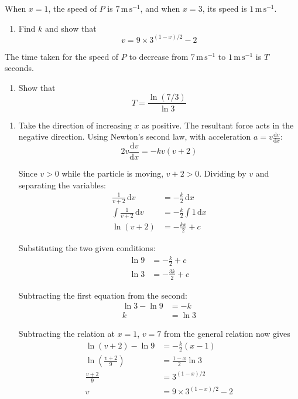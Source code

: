 \documentclass[leqno]{article}
\begin{document}
\begin{enumerate}[
  label=\textbf{\arabic*.},
  leftmargin=*,
  topsep=0pt,
  partopsep=0pt,
  parsep=0pt
]
When $x=1$, the speed of $P$ is $7\,\mathrm{m\,s^{-1}}$, and when $x=3$, its speed is $1\,\mathrm{m\,s^{-1}}$. \\

\begin{enumerate}[label=\textbf{(\alph*)}]
  \item Find $k$ and show that
  \[
  v=9\times 3^{(1-x)/2}-2
  \]
\end{enumerate}
The time taken for the speed of $P$ to decrease from $7\,\mathrm{m\,s^{-1}}$ to $1\,\mathrm{m\,s^{-1}}$ is $T$ seconds. \\
\begin{enumerate}[label=\textbf{(\alph*)}, resume]
  \item Show that
  \[
  T=\frac{\ln(7/3)}{\ln 3}
  \]
\end{enumerate}

\vspace*{10pt}

\begin{djsSolution}
\begin{enumerate}[label=\textbf{(\alph*)}, start=1]
\item Take the direction of increasing \(x\) as positive. The resultant force acts in the negative direction. Using Newton's second law, with acceleration \(a=v\frac{\mathrm{d}v}{\mathrm{d}x}\):
\[
2v\frac{\mathrm{d}v}{\mathrm{d}x}=-kv(v+2)
\]

Since \(v>0\) while the particle is moving, \(v+2>0\). Dividing by \(v\) and separating the variables:
\begin{align*}
\frac{1}{v+2}\,\mathrm{d}v&=-\frac{k}{2}\,\mathrm{d}x\\
\int\frac{1}{v+2}\,\mathrm{d}v&=-\frac{k}{2}\int 1\,\mathrm{d}x\\
\ln(v+2)&=-\frac{kx}{2}+c
\end{align*}

Substituting the two given conditions:
\begin{align*}
\ln 9&=-\frac{k}{2}+c\\
\ln 3&=-\frac{3k}{2}+c
\end{align*}

Subtracting the first equation from the second:
\begin{align*}
\ln 3-\ln 9&=-k\\
k&=\ln 3
\end{align*}

Subtracting the relation at \(x=1\), \(v=7\) from the general relation now gives
\begin{align*}
\ln(v+2)-\ln 9&=-\frac{k}{2}(x-1)\\
\ln\left(\frac{v+2}{9}\right)&=\frac{1-x}{2}\ln 3\\
\frac{v+2}{9}&=3^{(1-x)/2}\\
v&=9\times 3^{(1-x)/2}-2
\end{align*}


\end{enumerate}
\end{djsSolution}
\end{enumerate}
\end{document}
